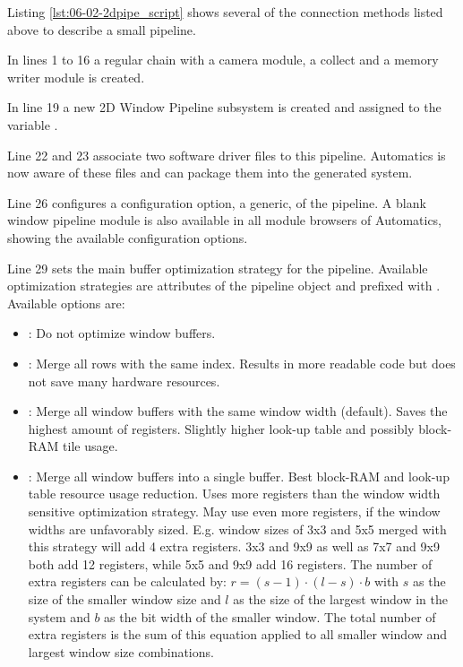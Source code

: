 Listing \ref{lst:06-02-2dpipe_script} shows several of the connection methods listed above to describe a small pipeline.

In lines 1 to 16 a regular chain with a camera module, a collect and a memory writer module is created.

In line 19 a new 2D Window Pipeline subsystem is created and assigned to the variable .

Line 22 and 23 associate two software driver files to this pipeline.
Automatics is now aware of these files and can package them into the generated system.

Line 26 configures a configuration option, a generic, of the pipeline.
A blank window pipeline module is also available in all module browsers of Automatics, showing the available configuration options.

Line 29 sets the main buffer optimization strategy for the pipeline.
Available optimization strategies are attributes of the pipeline object and prefixed with .
Available options are:
\begin{itemize}
\item {}: Do not optimize window buffers.
\item {}: Merge all rows with the same index. Results in more readable code but does not save many hardware resources.
\item {}: Merge all window buffers with the same window width (default). Saves the highest amount of registers. Slightly higher look-up table and possibly block-RAM tile usage.
\item {}: Merge all window buffers into a single buffer. Best block-RAM and look-up table resource usage reduction. Uses more registers than the window width sensitive optimization strategy. May use even more registers, if the window widths are unfavorably sized. E.g. window sizes of 3x3 and 5x5 merged with this strategy will add 4 extra registers. 3x3 and 9x9 as well as 7x7 and 9x9 both add 12 registers, while 5x5 and 9x9 add 16 registers. The number of extra registers can be calculated by: \(r = (s - 1) \cdot (l - s) \cdot b\) with \(s\) as the size of the smaller window size and \(l\) as the size of the largest window in the system and \(b\) as the bit width of the smaller window. The total number of extra registers is the sum of this equation applied to all smaller window and largest window size combinations.
\end{itemize}

